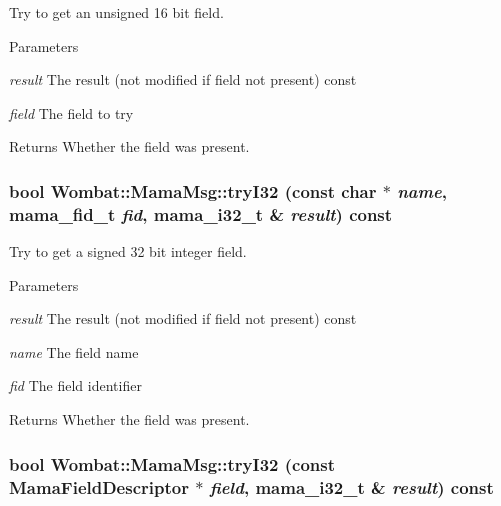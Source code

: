 Try to get an unsigned 16 bit field. 
\begin{DoxyParams}{Parameters}
\item[{\em result}]The result (not modified if field not present) const \item[{\em field}]The field to try \end{DoxyParams}
\begin{DoxyReturn}{Returns}
Whether the field was present. 
\end{DoxyReturn}
\hypertarget{classWombat_1_1MamaMsg_adc7f892793ac819719110984b0a509b5}{
\subsubsection[{tryI32}]{\setlength{\rightskip}{0pt plus 5cm}bool Wombat::MamaMsg::tryI32 (const char $\ast$ {\em name}, \/  mama\_\-fid\_\-t {\em fid}, \/  mama\_\-i32\_\-t \& {\em result}) const}}
\label{classWombat_1_1MamaMsg_adc7f892793ac819719110984b0a509b5}


Try to get a signed 32 bit integer field. 
\begin{DoxyParams}{Parameters}
\item[{\em result}]The result (not modified if field not present) const \item[{\em name}]The field name \item[{\em fid}]The field identifier \end{DoxyParams}
\begin{DoxyReturn}{Returns}
Whether the field was present. 
\end{DoxyReturn}
\hypertarget{classWombat_1_1MamaMsg_a0ddb06d9593997d9d840fe4e23d510bb}{
\subsubsection[{tryI32}]{\setlength{\rightskip}{0pt plus 5cm}bool Wombat::MamaMsg::tryI32 (const {\bf MamaFieldDescriptor} $\ast$ {\em field}, \/  mama\_\-i32\_\-t \& {\em result}) const}}
\label{classWombat_1_1MamaMsg_a0ddb06d9593997d9d840fe4e23d510bb}


